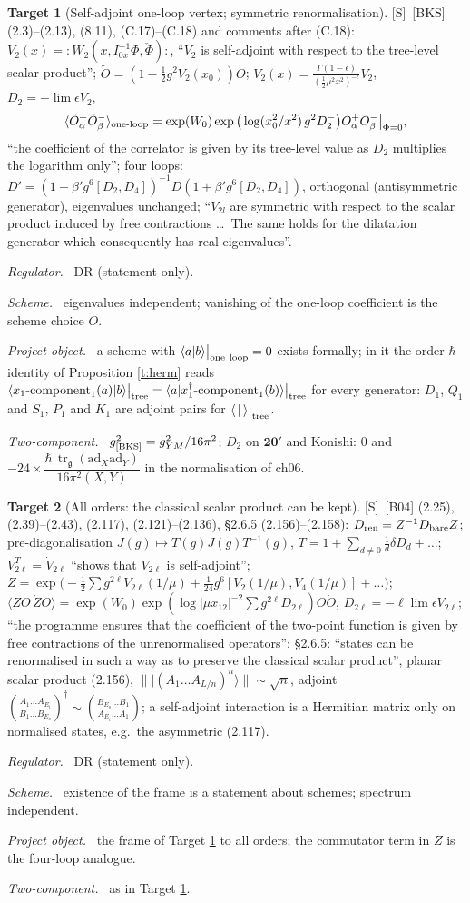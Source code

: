 \documentclass[11pt]{article}
\theoremstyle{definition}
\newtheorem{target}{Target}
\newcommand{\tr}{\operatorname{tr}}
\newcommand{\Sl}{\textup{[S]}}
\newcommand{\unit}{\dfrac{\hbar\,\tr_{\mathfrak g}(\mathrm{ad}_X\mathrm{ad}_Y)}{16\pi^2(X,Y)}}
\newcommand{\tree}{\big|_{\rm tree}}
\newcommand{\oneloop}{\big|_{\rm one\ loop}}
\newcommand{\fld}[1]{\par\textit{#1.}\ }
\begin{document}
\begin{target}[Self-adjoint one-loop vertex; symmetric renormalisation]\label{t:bks}
\Sl\ [BKS] (2.3)--(2.13), (8.11), (C.17)--(C.18) and comments after (C.18): $V_2(x)=:W_2(x,I_{0x}^{-1}\Phi,\check\Phi):$, ``$V_2$ is self-adjoint with respect to the tree-level scalar product''; $\tilde O=(1-\tfrac12g^2V_2(x_0))O$; $V_2(x)=\frac{\Gamma(1-\epsilon)}{(\frac12\mu^2x^2)^{-\epsilon}}V_2$, $D_2=-\lim\epsilon V_2$,
\[
\langle\tilde O^+_\alpha\tilde O^-_\beta\rangle_{\rm one\text{-}loop}=\exp(W_0)\exp\big(\log(x_0^2/x^2)\,g^2D_2^-\big)O^+_\alpha O^-_\beta\big|_{\Phi=0},
\]
``the coefficient of the correlator is given by its tree-level value as $D_2$ multiplies the logarithm only''; four loops: $D'=(1+\beta'g^6[D_2,D_4])^{-1}D(1+\beta'g^6[D_2,D_4])$, orthogonal (antisymmetric generator), eigenvalues unchanged; ``$V_{2l}$ are symmetric with respect to the scalar product induced by free contractions \dots\ The same holds for the dilatation generator which consequently has real eigenvalues''.
\fld{Regulator} DR (statement only).
\fld{Scheme} eigenvalues independent; vanishing of the one-loop coefficient is the scheme choice $\tilde O$.
\fld{Project object} a scheme with $\langle a|b\rangle\oneloop=0$ exists formally; in it the order-$\hbar$ identity of Proposition \ref{t:herm} reads $\langle x_1\text{-component}_1(a)|b\rangle\tree=\langle a|x_1^\dagger\text{-component}_1(b)\rangle\tree$ for every generator: $D_1$, $Q_1$ and $S_1$, $P_1$ and $K_1$ are adjoint pairs for $\langle\,|\,\rangle\tree$.
\fld{Two-component} $g^2_{\rm[BKS]}=g^2_{YM}/16\pi^2$; $D_2$ on $\mathbf{20'}$ and Konishi: $0$ and $-24\times\unit$ in the normalisation of ch06.
\end{target}

\begin{target}[All orders: the classical scalar product can be kept]\label{t:b04-all}
\Sl\ [B04] (2.25), (2.39)--(2.43), (2.117), (2.121)--(2.136), \S2.6.5 (2.156)--(2.158): $D_{\rm ren}=Z^{-1}D_{\rm bare}Z$; pre-diagonalisation $J(g)\mapsto T(g)J(g)T^{-1}(g)$, $T=1+\sum_{d\ne0}\frac1d\delta D_d+\dots$; $V_{2\ell}^T=\dot V_{2\ell}$ ``shows that $V_{2\ell}$ is self-adjoint''; $Z=\exp\big(-\tfrac12\sum g^{2\ell}V_{2\ell}(1/\mu)+\tfrac1{24}g^6[V_2(1/\mu),V_4(1/\mu)]+\dots\big)$; $\langle ZO\,\dot Z\dot O\rangle=\exp(W_0)\exp(\log|\mu x_{12}|^{-2}\sum g^{2\ell}D_{2\ell})O\dot O$, $D_{2\ell}=-\ell\lim\epsilon V_{2\ell}$; ``the programme ensures that the coefficient of the two-point function is given by free contractions of the unrenormalised operators''; \S2.6.5: ``states can be renormalised in such a way as to preserve the classical scalar product'', planar scalar product (2.156), $\| |(A_1\dots A_{L/n})^n\rangle\|\sim\sqrt n$, adjoint $\binom{A_1\dots A_{E_i}}{B_1\dots B_{E_o}}^\dagger\sim\binom{B_{E_o}\dots B_1}{A_{E_i}\dots A_1}$; a self-adjoint interaction is a Hermitian matrix only on normalised states, e.g.\ the asymmetric (2.117).
\fld{Regulator} DR (statement only).
\fld{Scheme} existence of the frame is a statement about schemes; spectrum independent.
\fld{Project object} the frame of Target \ref{t:bks} to all orders; the commutator term in $Z$ is the four-loop analogue.
\fld{Two-component} as in Target \ref{t:bks}.
\end{target}
\end{document}
